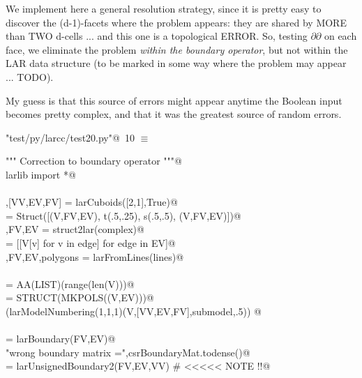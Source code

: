 \documentclass[11pt,oneside]{article}    %
\begin{document}
We implement here a general resolution strategy, since it is pretty  easy to discover the (d-1)-facets where the problem appears:  they are shared by MORE than TWO d-cells ... and this one is a topological ERROR. So, testing $\partial\partial$ on each face, we eliminate the problem \emph{within the boundary operator}, but not within the LAR data structure (to be marked in some way where the problem may appear ... TODO).

My guess is that this source of errors might appear anytime the Boolean input becomes pretty complex, and that it was the greatest source of random errors. 

\begin{flushleft} \small \label{scrap18}
\protect{}\verb@"test/py/larcc/test20.py"@\nobreak\ {\footnotesize 10 }$\equiv$
\vspace{-1ex}
\begin{list}{}{} \item
\mbox{}\verb@""" Correction to boundary operator """@\\
\mbox{}\verb@from larlib import *@\\
\mbox{}\verb@@\\
\mbox{}\verb@V,[VV,EV,FV] = larCuboids([2,1],True)@\\
\mbox{}\verb@complex = Struct([(V,FV,EV), t(.5,.25), s(.5,.5), (V,FV,EV)])@\\
\mbox{}\verb@V,FV,EV = struct2lar(complex)@\\
\mbox{}\verb@lines = [[V[v] for v in edge] for edge in EV]@\\
\mbox{}\verb@V,FV,EV,polygons = larFromLines(lines)@\\
\mbox{}\verb@@\\
\mbox{}\verb@VV = AA(LIST)(range(len(V)))@\\
\mbox{}\verb@submodel = STRUCT(MKPOLS((V,EV)))@\\
\mbox{}\verb@VIEW(larModelNumbering(1,1,1)(V,[VV,EV,FV],submodel,.5)) @\\
\mbox{}\verb@@\\
\mbox{}\verb@csrBoundaryMat = larBoundary(FV,EV)@\\
\mbox{}\verb@print "wrong boundary matrix =",csrBoundaryMat.todense()@\\
\mbox{}\verb@csrBoundaryMat = larUnsignedBoundary2(FV,EV,VV)  # <<<<< NOTE !!@\\

\end{list}
\end{flushleft}
\end{document}
